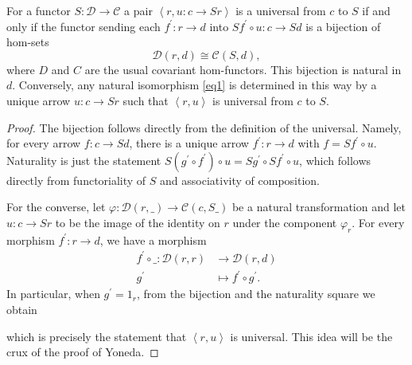 \documentclass[10pt]{amsart}
\begin{document}
\begin{prop}
  For a functor $S \colon \mathcal{D} \rightarrow \mathcal{C}$ a pair $\left<r, u \colon c \rightarrow Sr\right>$ is a universal from $c$ to $S$ if and only if the functor sending each $f^\prime \colon r \rightarrow d$ into $Sf^\prime \circ u \colon c \rightarrow Sd$ is a bijection of hom-sets
  \begin{equation}\label{eq1}
    \mathcal{D}(r,d) \cong \mathcal{C}(S,d),
  \end{equation}
  where $D$ and $C$ are the usual covariant hom-functors.
  This bijection is natural in $d$.
  Conversely, any natural isomorphism \eqref{eq1} is determined in this way by a unique arrow $u \colon c \rightarrow Sr$ such that $\left<r,u\right>$ is universal from $c$ to $S$.
  
  \begin{proof}
    The bijection follows directly from the definition of the universal.
    Namely, for every arrow $f \colon c \rightarrow Sd$, there is a unique arrow $f^\prime \colon r \rightarrow d$ with $f = Sf^\prime \circ u$.
    Naturality is just the statement $S(g^\prime \circ f^\prime) \circ u = Sg^\prime \circ Sf^\prime \circ u$, which follows directly from functoriality of $S$ and associativity of composition.

    For the converse, let $\varphi \colon \mathcal{D}(r,\_) \rightarrow \mathcal{C}(c, {S\_})$ be a natural transformation and let $u \colon c \rightarrow Sr$ to be the image of the identity on $r$ under the component $\varphi_r$.
    For every morphism $f^\prime \colon r \rightarrow d$, we have a morphism
    \begin{align*}
      f^\prime \circ \_ \colon \mathcal{D}(r,r) &\rightarrow \mathcal{D}(r,d)\\
      g^\prime &\mapsto f^\prime \circ g^\prime.
    \end{align*}
    In particular, when $g^\prime = 1_r$, from the bijection and the naturality square we obtain
    \begin{center}
    \end{center}
    which is precisely the statement that $\left<r, u\right>$ is universal.
    This idea will be the crux of the proof of Yoneda.
  \end{proof}
\end{prop}
\end{document}
